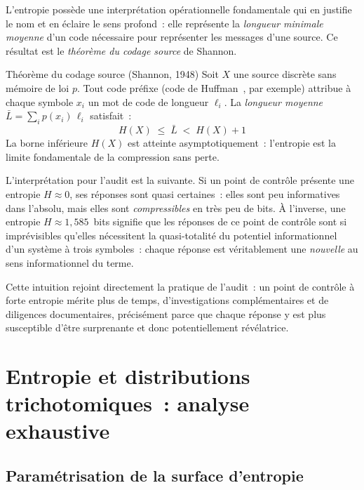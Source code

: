 L'entropie possède une interprétation opérationnelle fondamentale qui en justifie
le nom et en éclaire le sens profond~: elle représente la \emph{longueur minimale
moyenne} d'un code nécessaire pour représenter les messages d'une source. Ce
résultat est le \emph{théorème du codage source} de Shannon.

\begin{boiteTheoreme}{Théorème du codage source (Shannon, 1948)}
Soit $X$ une source discrète sans mémoire de loi $p$. Tout code préfixe
(code de Huffman~\cite{Huffman1952}, par exemple) attribue à chaque symbole $x_i$
un mot de code de longueur $\ell_i$. La \emph{longueur moyenne} $\bar{L} =
\sum_i p(x_i)\,\ell_i$ satisfait~:
\begin{equation}
  H(X) \;\leq\; \bar{L} \;<\; H(X) + 1
  \label{eq:codage-source}
\end{equation}
La borne inférieure $H(X)$ est atteinte asymptotiquement~: l'entropie est la
limite fondamentale de la compression sans perte.
\end{boiteTheoreme}

L'interprétation pour l'audit est la suivante. Si un point de contrôle présente
une entropie $H \approx 0$, ses réponses sont quasi certaines~: elles sont peu
informatives dans l'absolu, mais elles sont \emph{compressibles} en très peu de
bits. À l'inverse, une entropie $H \approx 1{,}585$~bits signifie que les
réponses de ce point de contrôle sont si imprévisibles qu'elles nécessitent la
quasi-totalité du potentiel informationnel d'un système à trois symboles~: chaque
réponse est véritablement une \emph{nouvelle} au sens informationnel du terme.

Cette intuition rejoint directement la pratique de l'audit~: un point de contrôle
à forte entropie mérite plus de temps, d'investigations complémentaires et de
diligences documentaires, précisément parce que chaque réponse y est plus
susceptible d'être surprenante et donc potentiellement révélatrice.

\section{Entropie et distributions trichotomiques~: analyse exhaustive}
\label{sec:trichotomique}

\subsection{Paramétrisation de la surface d'entropie}

